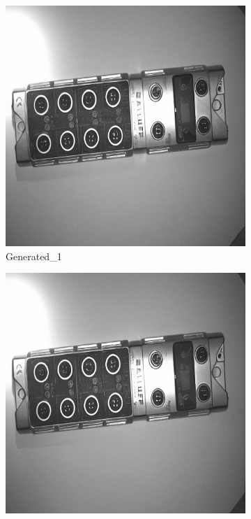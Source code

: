 \documentclass[12pt,DIV14,BCOR12mm,a4paper,footinclude=false,headinclude,parskip=half-,twoside,openright,cleardoublepage=empty,toc=index,bibliography=totoc,listof=totoc]{scrreprt}
\numberwithin{equation}{chapter}
\begin{document}
\begin{figure}
    \begin{minipage}[H]{\linewidth}
        \centering
        \begin{minipage}[H]{0.5\linewidth} %
            \centering
            \begin{subfigure}[t]{0.48\linewidth}
                \centering
                \includegraphics[width=\linewidth]{../media/bni_generated_1_1.png}
                \caption{Generated\_1}
            \end{subfigure}%
            \hfill
            \begin{subfigure}[t]{0.48\linewidth}
                \centering
                \includegraphics[width=\linewidth]{../media/bni_generated_1_2.png}

\end{subfigure}
\end{minipage}
\end{minipage}
\end{figure}
\end{document}
